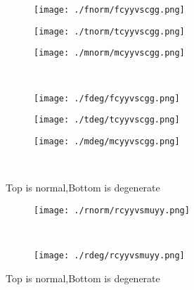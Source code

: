 \documentclass[aps,floats,floatfix,nofootinbib]{revtex4-1}
\begin{document}
\begin{center}
\begin{figure}
\begin{subfigure}{0.3\textwidth}
\texttt{[image: ./fnorm/fcyyvscgg.png]}
\label{}
\end{subfigure}
\begin{subfigure}{0.3\textwidth}
\texttt{[image: ./tnorm/tcyyvscgg.png]}
\label{}
\end{subfigure}
\begin{subfigure}{0.3\textwidth}
\texttt{[image: ./mnorm/mcyyvscgg.png]}
\label{}
\end{subfigure}\\
\begin{subfigure}{0.3\textwidth}
\texttt{[image: ./fdeg/fcyyvscgg.png]}
\label{}
\end{subfigure}
\begin{subfigure}{0.3\textwidth}
\texttt{[image: ./tdeg/tcyyvscgg.png]}
\label{}
\end{subfigure}
\begin{subfigure}{0.3\textwidth}
\texttt{[image: ./mdeg/mcyyvscgg.png]}
\label{}
\end{subfigure}\\
\caption{Top is normal,Bottom is degenerate}
\end{figure}
\end{center}

\begin{center}
\begin{figure}
\begin{subfigure}{0.95\textwidth}
\texttt{[image: ./rnorm/rcyyvsmuyy.png]}
\label{}
\end{subfigure}\\
\begin{subfigure}{0.95\textwidth}
\texttt{[image: ./rdeg/rcyyvsmuyy.png]}
\label{}
\end{subfigure}
\caption{Top is normal,Bottom is degenerate}
\end{figure}
\end{center}
\end{document}
